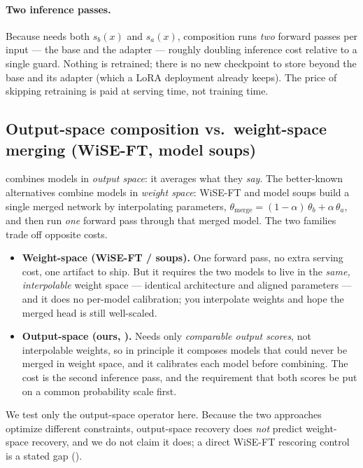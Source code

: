 \paragraph{Two inference passes.}
Because  needs both $s_b(x)$ and $s_a(x)$, composition runs \emph{two} forward
passes per input --- the base and the adapter --- roughly doubling inference cost relative to a
single guard. Nothing is retrained; there is no new checkpoint to store beyond the base and its
adapter (which a LoRA deployment already keeps). The price of skipping retraining is paid at
serving time, not training time.

\subsection{Output-space composition vs.\ weight-space merging (WiSE-FT, model soups)}
\label{sec:actIII-weightspace}

 combines models in \emph{output space}: it averages what they \emph{say}. The
better-known alternatives combine models in \emph{weight space}: WiSE-FT and model soups
\citep{wortsman2022wiseft,wortsman2022modelsoups} build a single merged network by interpolating
parameters, $\theta_{\mathrm{merge}}=(1-\alpha)\,\theta_{b}+\alpha\,\theta_{a}$, and then run
\emph{one} forward pass through that merged model. The two families trade off opposite costs.

\begin{itemize}[leftmargin=1.4em,itemsep=1pt]
  \item \textbf{Weight-space (WiSE-FT / soups).} One forward pass, no extra serving cost, one
  artifact to ship. But it requires the two models to live in the \emph{same, interpolable}
  weight space --- identical architecture and aligned parameters --- and it does no per-model
  calibration; you interpolate weights and hope the merged head is still well-scaled.
  \item \textbf{Output-space (ours, ).} Needs only \emph{comparable output scores},
  not interpolable weights, so in principle it composes models that could never be merged in
  weight space, and it calibrates each model before combining. The cost is the second inference
  pass, and the requirement that both scores be put on a common probability scale first.
\end{itemize}

We test only the output-space operator here. Because the two approaches optimize different
constraints, output-space recovery does \emph{not} predict weight-space recovery, and we do not
claim it does; a direct WiSE-FT rescoring control is a stated gap ().

